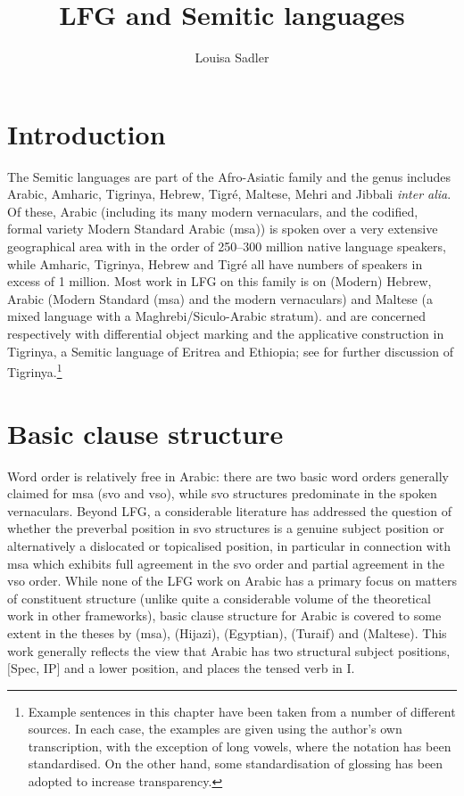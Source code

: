 \documentclass[output=paper,hidelinks]{langscibook}
\title{LFG and Semitic languages}
\author{Louisa Sadler\affiliation{University of Essex}}
\begin{document}
\maketitle
\label{chap:Semitic}

\section{Introduction}

The Semitic languages are part of the Afro-Asiatic family  and the genus includes  Arabic, Amharic, Tigrinya, Hebrew, Tigr\'{e}, Maltese, Mehri and Jibbali {\em inter alia}.  Of these, Arabic (including its many modern vernaculars, and the codified, formal variety Modern Standard Arabic ({\sc msa}))  is spoken over a very extensive geographical area with in the order of 250--300 million native language speakers, while Amharic, Tigrinya, Hebrew and Tigr\'{e} all have numbers of speakers in excess of 1 million.  Most work in LFG on this family is on (Modern) Hebrew, Arabic (Modern Standard ({\sc msa}) and the modern vernaculars)  and Maltese (a mixed language with a Maghrebi/Siculo-Arabic stratum).  \citet{Kifle07}  and \citet{amlesomkinfe2011} are concerned respectively with differential object marking and the applicative construction in Tigrinya, a Semitic language of Eritrea and Ethiopia; see  for further discussion of Tigrinya.\footnote{Example sentences in this chapter have been taken from a number of different sources. In each case, the examples are given using the author's own transcription, with the exception of long vowels, where the notation has been standardised. On the other hand, some standardisation of glossing has been adopted to increase transparency.}


\section{Basic clause structure}

Word order is relatively free in Arabic: there are two basic word orders  generally claimed for {\sc msa} ({\sc svo} and {\sc vso}), while {\sc svo} structures predominate in the spoken vernaculars.     Beyond LFG, a considerable literature has addressed the question of whether the preverbal position in {\sc svo} structures is a genuine subject position or alternatively a dislocated or topicalised position, in particular in connection with {\sc msa} which exhibits full agreement in the {\sc svo} order and partial agreement in the {\sc vso} order.    While none of the LFG work on Arabic has a primary focus on matters of constituent structure (unlike quite a considerable volume of the theoretical work in other frameworks), basic clause structure for Arabic is covered to some extent in the theses  by \citet{Alsharif:PhD} ({\sc msa}), \citet{Alotaibi14Conditional} (Hijazi), \citet{ElSadek:PhD} (Egyptian),  \citet{Alruwaili:PhD} (Turaif)   and \citet{Camilleri:PhD16} (Maltese).  This work generally reflects the view that Arabic has two structural subject positions, $[$Spec, IP$]$  and a lower position, and places the tensed verb in I.
\end{document}
